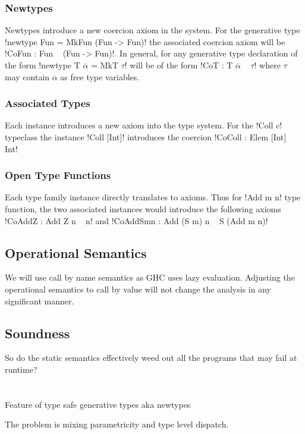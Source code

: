 \documentclass[manuscript,screen,nonacm]{acmart}
\begin{document}
\subsubsection{Newtypes}
Newtypes introduce a new coercion axiom in the system. For the generative type !newtype Fun = MkFun (Fun -> Fun)!
the associated coercion axiom will be !CoFun : Fun ~ (Fun -> Fun)!. In general, for any generative type declaration of the form !newtype T $\overline\alpha$ = MkT $\tau$! will be of the form !CoT : T $\overline\alpha$ ~ $\tau$! where $\tau$ may contain $\overline\alpha$ as free type variables.

\subsubsection{Associated Types}
Each instance introduces a new axiom into the type system. For the !Coll c! typeclass the instance !Coll [Int]! introduces the coercion !CoColl : Elem [Int] ~ Int!

\subsubsection{Open Type Functions}
Each type family instance directly translates to axioms. Thus for !Add m n! type function, the two associated instances would introduce the following axioms !CoAddZ : Add Z n ~ n! and !CoAddSmn : Add (S m) n ~ S (Add m n)!

\subsection{Operational Semantics}
We will use call by name semantics as GHC uses lazy evaluation. Adjusting the operational semantics to call by value will not change the analysis in any significant manner.


\subsection{Soundness}
So do the static semantics effectively weed out all the programs that may fail at runtime?
  


\section{\SFR}\label{sec:sfr} %

Feature of type safe generative types aka newtypes

The problem is mixing parametricity and type level dispatch.
\end{document}
